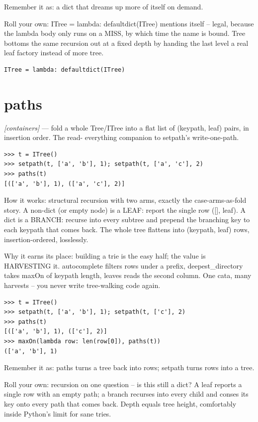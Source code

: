 \documentclass[11pt,letterpaper]{book}
\begin{document}
Remember it as: a dict that dreams up more of itself on demand.


Roll your own: ITree = lambda: defaultdict(ITree) mentions itself -- legal, because the lambda body only runs on a MISS, by which time the name is bound. Tree bottoms the same recursion out at a fixed depth by handing the last level a real leaf factory instead of more tree.

\begin{lstlisting}[style=code]
ITree = lambda: defaultdict(ITree)
\end{lstlisting}

\section{paths}
\noindent\textit{[containers]} --- fold a whole Tree/ITree into a flat list of (keypath, leaf) pairs, in insertion order. The read- everything companion to setpath's write-one-path.
\begin{lstlisting}[style=spec]
>>> t = ITree()
>>> setpath(t, ['a', 'b'], 1); setpath(t, ['a', 'c'], 2)
>>> paths(t)
[(['a', 'b'], 1), (['a', 'c'], 2)]
\end{lstlisting}

How it works: structural recursion with two arms, exactly the case-arms-as-fold story. A non-dict (or empty node) is a LEAF: report the single row ([], leaf). A dict is a BRANCH: recurse into every subtree and prepend the branching key to each keypath that comes back. The whole tree flattens into (keypath, leaf) rows, insertion-ordered, losslessly.


Why it earns its place: building a trie is the easy half; the value is HARVESTING it. autocomplete filters rows under a prefix, deepest\_directory takes maxOn of keypath length, leaves reads the second column. One cata, many harvests -- you never write tree-walking code again.

\begin{lstlisting}[style=spec]
>>> t = ITree()
>>> setpath(t, ['a', 'b'], 1); setpath(t, ['c'], 2)
>>> paths(t)
[(['a', 'b'], 1), (['c'], 2)]
>>> maxOn(lambda row: len(row[0]), paths(t))
(['a', 'b'], 1)
\end{lstlisting}

Remember it as: paths turns a tree back into rows; setpath turns rows into a tree.


Roll your own: recursion on one question -- is this still a dict? A leaf reports a single row with an empty path; a branch recurses into every child and conses its key onto every path that comes back. Depth equals tree height, comfortably inside Python's limit for sane tries.
\end{document}
